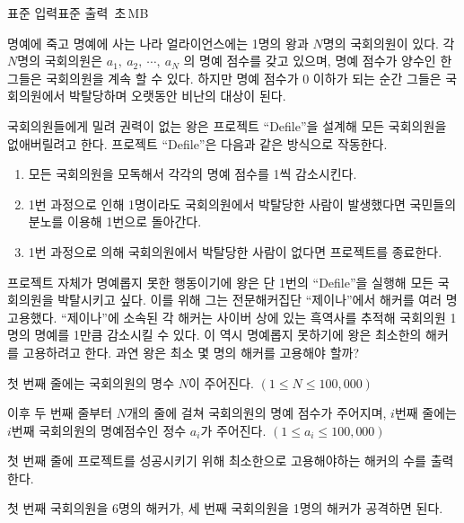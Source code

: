 \begin{problem}{\kcpcdefiletitle}
    {표준 입력}{표준 출력}
    {\kcpcdefiletime\,초}{\kcpcdefilememory\,MB}{}{\kcpcdefilescore}
    
    명예에 죽고 명예에 사는 나라 얼라이언스에는 1명의 왕과 $ N $명의 국회의원이 있다. 각 $ N $명의 국회의원은 $ a_1,\ a_2,\ \cdots,\ a_N $ 의 명예 점수를 갖고 있으며, 명예 점수가 양수인 한 그들은 국회의원을 계속 할 수 있다. 하지만 명예 점수가 0 이하가 되는 순간 그들은 국회의원에서 박탈당하며 오랫동안 비난의 대상이 된다.
    
    국회의원들에게 밀려 권력이 없는 왕은 프로젝트 ``Defile”을 설계해 모든 국회의원을 없애버릴려고 한다. 프로젝트 ``Defile”은 다음과 같은 방식으로 작동한다.
    
    \begin{enumerate}
        \item 모든 국회의원을 모독해서 각각의 명예 점수를 1씩 감소시킨다.
        \item 1번 과정으로 인해 1명이라도 국회의원에서 박탈당한 사람이 발생했다면 국민들의 분노를 이용해 1번으로 돌아간다.
        \item 1번 과정으로 의해 국회의원에서 박탈당한 사람이 없다면 프로젝트를 종료한다.
    \end{enumerate}
    
    프로젝트 자체가 명예롭지 못한 행동이기에 왕은 단 1번의 ``Defile”을 실행해 모든 국회의원을 박탈시키고 싶다. 이를 위해 그는 전문해커집단 ``제이나”에서 해커를 여러 명 고용했다. ``제이나”에 소속된 각 해커는 사이버 상에 있는 흑역사를 추적해 국회의원 1명의 명예를 1만큼 감소시킬 수 있다. 이 역시 명예롭지 못하기에 왕은 최소한의 해커를 고용하려고 한다. 과연 왕은 최소 몇 명의 해커를 고용해야 할까? 
    
    \InputFile
    첫 번째 줄에는 국회의원의 명수 $ N $이 주어진다. $ (1 \leq N \leq 100,000) $
    
    이후 두 번째 줄부터 $ N $개의 줄에 걸쳐 국회의원의 명예 점수가 주어지며, $ i $번째 줄에는 $ i $번째 국회의원의 명예점수인 정수 $ a_i $가 주어진다. $ (1 \leq a_i \leq 100,000) $
    
    \OutputFile
    첫 번째 줄에 프로젝트를 성공시키기 위해 최소한으로 고용해야하는 해커의 수를 출력한다.
    
    \Examples
    
    \begin{example}
    \end{example}
    
    \Explanation
    첫 번째 국회의원을 6명의 해커가, 세 번째 국회의원을 1명의 해커가 공격하면 된다.
    
    
\end{problem}

